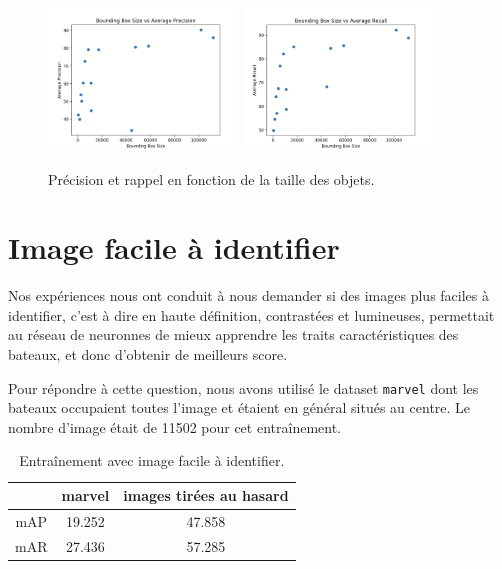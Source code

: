 \begin{figure}[H]
    \centering
    \includegraphics[width=0.45\textwidth]{./img/size_precision.png}
    \includegraphics[width=0.45\textwidth]{./img/size_recall.png}
    \caption{Précision et rappel en fonction de la taille des objets.}
\end{figure}

\section{Image facile à identifier}

Nos expériences nous ont conduit à nous demander si des images plus faciles à identifier, c'est à dire 
en haute définition, contrastées et lumineuses, permettait au réseau de neuronnes de mieux apprendre les 
traits caractéristiques des bateaux, et donc d'obtenir de meilleurs score. 

Pour répondre à cette question, nous avons utilisé le dataset \texttt{marvel} dont les bateaux occupaient 
toutes l'image et étaient en général situés au centre. Le nombre d'image était de 11502 pour cet entraînement. \\

\begin{table}[H]
    \begin{center}
        \begin{tabular}{c c c}
            \hline
            & marvel & images tirées au hasard\\
            \hline
            mAP & 19.252 & 47.858 \\
            mAR & 27.436 & 57.285 \\
        \end{tabular}
    \end{center}
    \caption{Entraînement avec image facile à identifier.}
\end{table}


